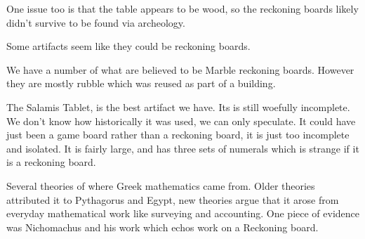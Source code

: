\documentclass{report}
\begin{document}
\begin{description}
\begin{mdframed}
            One issue too is that the table appears to be wood,
            so the reckoning boards likely didn't 
            survive to be found via archeology.
        \end{mdframed}
        \begin{mdframed}
            Some artifacts seem like they could be reckoning
            boards.
        \end{mdframed}
        \begin{mdframed}
            We have a number of what are believed to be Marble
            reckoning boards. However they are mostly rubble
            which was reused as part of a building.
        \end{mdframed}
        \begin{mdframed}
            The Salamis Tablet, is the best artifact we have.
            Its is still woefully incomplete. We don't know how
            historically it was used, we can only speculate. It
            could have just been a game board rather than a
            reckoning board, it is just too incomplete and
            isolated. It is fairly large, and has three
            sets of numerals which is strange if it is
            a reckoning board.
        \end{mdframed}
        \begin{mdframed}
            Several theories of where Greek mathematics came
            from. Older theories attributed it to Pythagorus
            and Egypt, new theories argue that it arose
            from everyday mathematical work like surveying
            and accounting. One piece of evidence was Nichomachus
            and his work which echos work on a Reckoning board.
        \end{mdframed}
\end{description}
\end{document}
